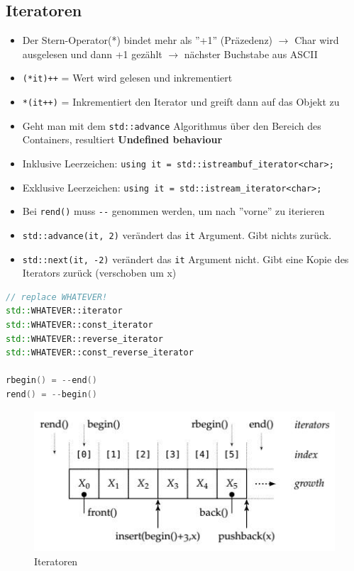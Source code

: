 \clearpage

\subsection{Iteratoren}
\begin{itemize}
	\item Der Stern-Operator(*) bindet mehr als	''+1'' (Präzedenz) $\rightarrow$ Char wird ausgelesen und dann +1 gezählt $\rightarrow$ nächster	Buchstabe aus ASCII	
	\item \lstinline|(*it)++| = Wert wird gelesen und inkrementiert
	\item \lstinline|*(it++)| = Inkrementiert den Iterator und greift dann auf das Objekt zu
	\item Geht man mit dem \lstinline|std::advance| Algorithmus über den Bereich des Containers, resultiert \textbf{Undefined behaviour}
	\item Inklusive Leerzeichen: \lstinline|using it = std::istreambuf_iterator<char>;|
	\item Exklusive Leerzeichen: \lstinline|using it = std::istream_iterator<char>;|
	\item Bei \lstinline|rend()| muss \lstinline|--| genommen werden, um nach ''vorne'' zu iterieren
	\item \lstinline|std::advance(it, 2)| verändert das \lstinline|it| Argument. Gibt nichts zurück. 
	\item \lstinline|std::next(it, -2)| verändert das \lstinline|it| Argument nicht. Gibt eine Kopie des Iterators zurück (verschoben um x)
\end{itemize}
\begin{lstlisting}[language=C++]
// replace WHATEVER!
std::WHATEVER::iterator 
std::WHATEVER::const_iterator 
std::WHATEVER::reverse_iterator 
std::WHATEVER::const_reverse_iterator 

rbegin() = --end() 
rend() = --begin()
\end{lstlisting}

\begin{figure}[h]
	\centering
	\includegraphics[width=0.7\linewidth]{images/iterator}
	\caption{Iteratoren}
	\label{fig:iterator}
\end{figure}



